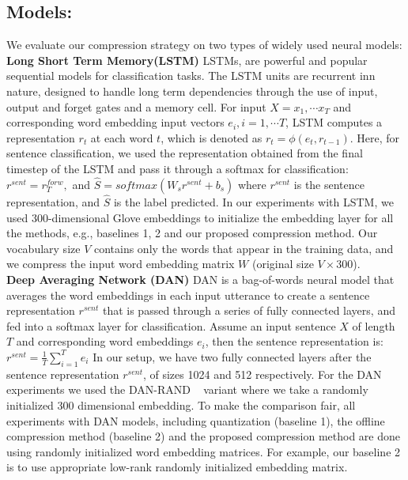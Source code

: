 \subsection{Models:}%
We evaluate our compression strategy on two types of widely used neural models: \\ %
\textbf {Long Short Term Memory(LSTM)}
LSTMs, are powerful and popular sequential models
for classification tasks. The LSTM units are recurrent inn nature, designed to
handle long term dependencies through the use of input, output
and forget gates and a memory cell. For input $X=x_1,
\cdots x_T $ and corresponding word embedding input vectors $e_i, i=1, \cdots
T$, LSTM computes a representation $r_t$ at each word $t$, which is denoted as
$r_t = \phi ( e_t ,r_{t-1} )$. Here, for sentence classification, we used the representation obtained from the final timestep of the LSTM and
pass it through a softmax for classification:
$r^{sent} = r^{forw}_{T},$ and $ \hat{S}=softmax( W_{s} r^{sent} + b_{s}) $
where $r^{sent}$ is the sentence representation, and $\hat{S}$ is the label
predicted. In our experiments with LSTM, we used
300-dimensional Glove embeddings to initialize the embedding layer for all the methods, e.g., baselines 1, 2 and our proposed compression method. Our vocabulary size $V$ contains only the words that appear in the training data, and we compress the input word embedding matrix $W$ (original size $V \times 300$).\\
\textbf{Deep Averaging Network (DAN)} DAN is a
bag-of-words neural model that averages the word embeddings in each input
utterance to create a sentence representation $r^{sent}$ that is passed
through a series of fully connected layers, and fed into a softmax layer for
classification. Assume an input sentence $X$ of length $T$ and
corresponding word embeddings $e_i$, then the sentence representation is: $r^{sent} = \frac{1}{T} \sum_{i=1}^T { e_i }$
In our setup, we have two fully connected layers after the sentence representation $r^{sent}$,
of sizes 1024 and 512 respectively. For the DAN experiments we used the DAN-RAND
~\cite{iyyer2015deep} variant where we take a randomly initialized 300
dimensional embedding. To make the comparison fair, all experiments with DAN models, including quantization (baseline 1), the offline compression method (baseline 2) and the proposed compression method are done using randomly initialized word embedding matrices. For example, our baseline 2 is to use appropriate low-rank randomly initialized embedding matrix. %
